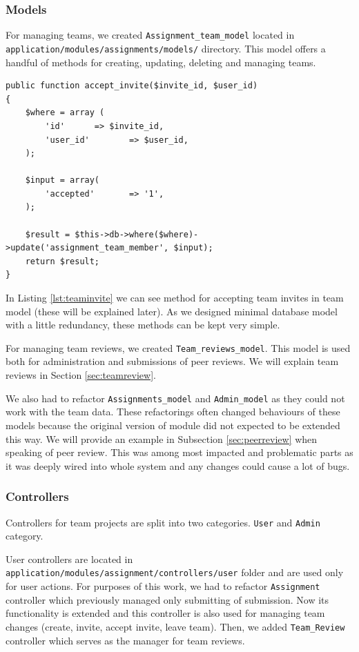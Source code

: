 \subsubsection{Models}
For managing teams, we created \texttt{Assignment\_team\_model} located in \\ \texttt{application/modules/assignments/models/} directory. This model offers a handful of methods for creating, updating, deleting and managing teams.

\begin{lstlisting}[caption={Method for accepting team invites},label={lst:teaminvite}]
public function accept_invite($invite_id, $user_id)
{
    $where = array (
        'id'      => $invite_id,
        'user_id'        => $user_id,
    );

    $input = array(
        'accepted'       => '1',
    );

    $result = $this->db->where($where)->update('assignment_team_member', $input);
    return $result;
}
\end{lstlisting}

In Listing \ref{lst:teaminvite} we can see method for accepting team invites in team model (these will be explained later). As we designed minimal database model with a little redundancy, these methods can be kept very simple.

For managing team reviews, we created \texttt{Team\_reviews\_model}. This model is used both for administration and submissions of peer reviews. We will explain team reviews in Section \ref{sec:teamreview}.

We also had to refactor \texttt{Assignments\_model} and \texttt{Admin\_model} as they could not work with the team data. These refactorings often changed behaviours of these models because the original version of module did not expected to be extended this way. We will provide an example in Subsection \ref{sec:peerreview} when speaking of peer review. This was among most impacted and problematic parts as it was deeply wired into whole system and any changes could cause a lot of bugs.

\subsubsection{Controllers}
Controllers for team projects are split into two categories. \texttt{User} and \texttt{Admin} category.

User controllers are located in \\ \texttt{application/modules/assignment/controllers/user} folder and are used only for user actions. For purposes of this work, we had to refactor \texttt{Assignment} controller which previously managed only submitting of submission. Now its functionality is extended and this controller is also used for managing team changes (create, invite, accept invite, leave team). Then, we added \texttt{Team\_Review} controller which serves as the manager for team reviews.

